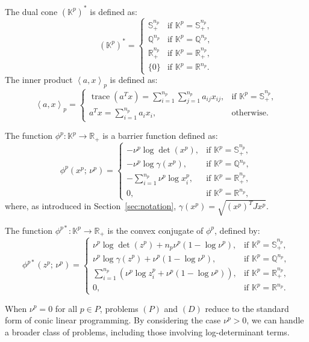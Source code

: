 The dual cone $(\mathbb{K}^p)^*$ is defined as:
\[
(\mathbb{K}^p)^* = 
\begin{cases}
    \mathbb{S}_{+}^{n_p} & \text{if } \mathbb{K}^{p} = \mathbb{S}_{+}^{n_p},\\
    \mathbb{Q}^{n_p}     & \text{if } \mathbb{K}^{p} = \mathbb{Q}^{n_p},\\
    \mathbb{R}_{+}^{n_p} & \text{if } \mathbb{K}^{p} = \mathbb{R}_{+}^{n_p},\\
    \{0\}                & \text{if } \mathbb{K}^{p} = \mathbb{R}^{n_p}.
\end{cases}
\]
The inner product $\left\langle a, x \right\rangle_p$ is defined as:
\[
\left\langle a, x \right\rangle_p = 
\begin{cases}
    \operatorname{trace}(a^T x) 
    = \sum_{i=1}^{n_p} \sum_{j=1}^{n_p} a_{ij} x_{ij}, 
    & \text{if } \mathbb{K}^p = \mathbb{S}_{+}^{n_p},\\[6pt]
    a^T x = \sum_{i=1}^{n_p} a_i x_i, 
    & \text{otherwise}.
\end{cases}
\]

The function $\phi^p : \mathbb{K}^p \to \mathbb{R}_+$ is a barrier function defined as:
\[
\phi^p(x^p;\, \nu^p) =
\begin{cases}
    -\nu^p \log \det(x^p), & \text{if } \mathbb{K}^{p} = \mathbb{S}_{+}^{n_p},\\
    -\nu^p \log \gamma(x^p), & \text{if } \mathbb{K}^{p} = \mathbb{Q}^{n_p},\\
    -\sum_{i=1}^{n_p} \nu^p \log x^p_i, & \text{if } \mathbb{K}^{p} = \mathbb{R}_{+}^{n_p},\\
    0, & \text{if } \mathbb{K}^{p} = \mathbb{R}^{n_p},
\end{cases}
\]
where, as introduced in Section~\ref{sec:notation}, $\gamma(x^p) = \sqrt{(x^p)^T J x^p}$.

The function $\phi^{p*} : \mathbb{K}^p \to \mathbb{R}_+$ is the convex conjugate of $\phi^p$, defined by:
\[
\phi^{p*}(z^p;\, \nu^p) =
\begin{cases}
    \nu^p \log \det(z^p) + n_p \nu^p (1 - \log \nu^p), 
    & \text{if } \mathbb{K}^{p} = \mathbb{S}_{+}^{n_p},\\[4pt]
    \nu^p \log \gamma(z^p) + \nu^p (1 - \log \nu^p), 
    & \text{if } \mathbb{K}^{p} = \mathbb{Q}^{n_p},\\[4pt]
    \sum_{i=1}^{n_p} \left( \nu^p \log z^p_i + \nu^p (1 - \log \nu^p) \right), 
    & \text{if } \mathbb{K}^{p} = \mathbb{R}_{+}^{n_p},\\[3pt]
    0, & \text{if } \mathbb{K}^{p} = \mathbb{R}^{n_p}.
\end{cases}
\]

When $\nu^p = 0$ for all $p \in P$, problems $(P)$ and $(D)$ reduce to the standard form of conic linear programming.
By considering the case $\nu^p > 0$, we can handle a broader class of problems, including those involving log-determinant terms.